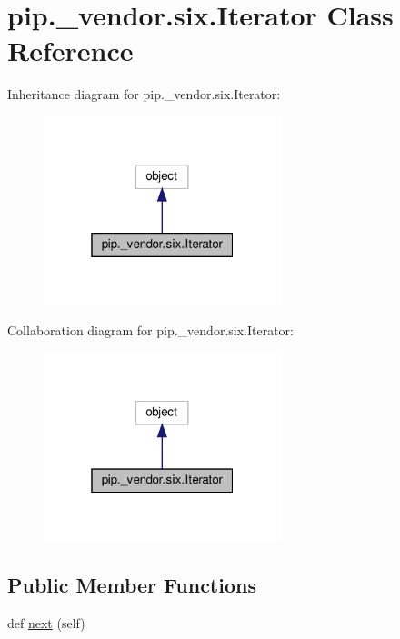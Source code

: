 \hypertarget{classpip_1_1__vendor_1_1six_1_1Iterator}{}\section{pip.\+\_\+vendor.\+six.\+Iterator Class Reference}
\label{classpip_1_1__vendor_1_1six_1_1Iterator}


Inheritance diagram for pip.\+\_\+vendor.\+six.\+Iterator\+:
\nopagebreak
\begin{figure}[H]
\begin{center}
\leavevmode
\includegraphics[width=196pt]{classpip_1_1__vendor_1_1six_1_1Iterator__inherit__graph}
\end{center}
\end{figure}


Collaboration diagram for pip.\+\_\+vendor.\+six.\+Iterator\+:
\nopagebreak
\begin{figure}[H]
\begin{center}
\leavevmode
\includegraphics[width=196pt]{classpip_1_1__vendor_1_1six_1_1Iterator__coll__graph}
\end{center}
\end{figure}
\subsection*{Public Member Functions}
\begin{DoxyCompactItemize}
\item 
def \hyperlink{classpip_1_1__vendor_1_1six_1_1Iterator_a322170436d350f8010920c8992f1fc69}{next} (self)
\end{DoxyCompactItemize}


